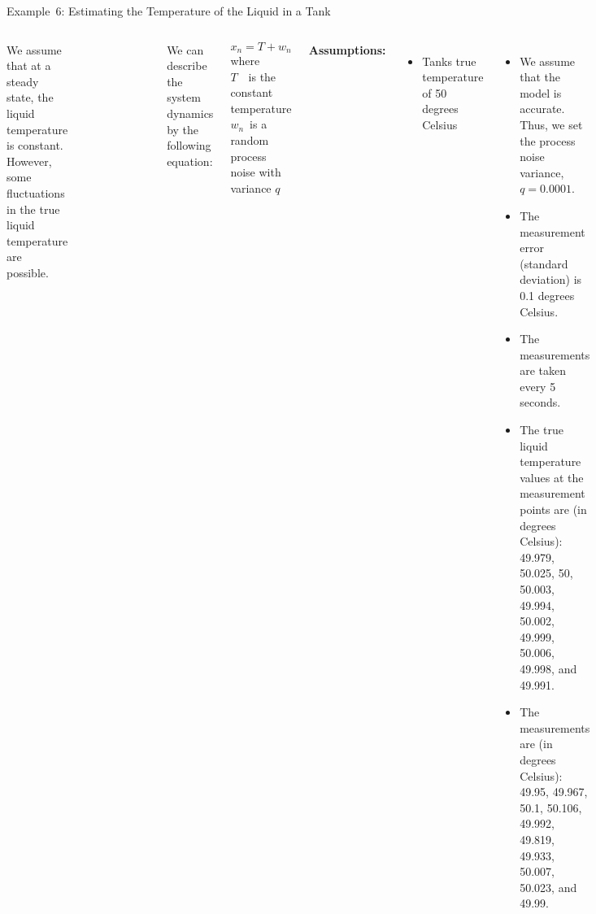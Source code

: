 \begin{frame}{Example~6: Estimating the Temperature of the Liquid in a Tank} 
\begin{columns}
    We assume that at a steady state, the liquid temperature is constant. However, some fluctuations in the true liquid temperature are possible. 
    \begin{figure}
        \centering
        \includegraphics[width=0.5\textwidth]{Figures/Chapter1/ex6_liquid_temperature.png}
        \label{fig:ex6_liquid_temperature}
    \end{figure}
    
    
    We can describe the system dynamics by the following equation:
    
    $$x_n = T + w_n$$
    where\\
    $T$~~is the constant temperature\\
    $w_n$~is a random process noise with variance $q$
    
    \textbf{Assumptions:}
    \begin{itemize}
        \item Tanks true temperature of 50 degrees Celsius
    \end{itemize}
    
    \begin{itemize}
        \item We assume that the model is accurate. Thus, we set the process noise variance, $q=0.0001$.
        \item The measurement error (standard deviation) is 0.1 degrees Celsius.
        \item The measurements are taken every 5 seconds.
        \item The true liquid temperature values at the measurement points are (in degrees Celsius): 49.979, 50.025, 50, 50.003, 49.994, 50.002, 49.999, 50.006, 49.998, and 49.991.
        \item The measurements are (in degrees Celsius): 49.95, 49.967, 50.1, 50.106, 49.992, 49.819, 49.933, 50.007, 50.023, and 49.99.
    \end{itemize}
\end{columns}

    
\end{frame}

